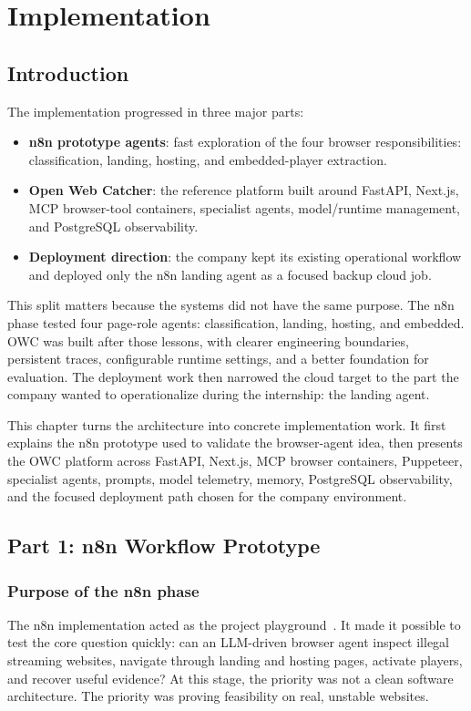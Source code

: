 \chapter{Implementation}\label{chap:implementation}

\section{Introduction}

The implementation progressed in three major parts:
\begin{itemize}
  \item \textbf{n8n prototype agents}: fast exploration of the four browser
  responsibilities: classification, landing, hosting, and embedded-player extraction.
  \item \textbf{Open Web Catcher}: the reference platform built around
  FastAPI, Next.js, MCP browser-tool containers, specialist agents, model/runtime
  management, and PostgreSQL observability.
  \item \textbf{Deployment direction}: the company kept its existing operational
  workflow and deployed only the n8n landing agent as a focused backup cloud job.
\end{itemize}

This split matters because the systems did not have the same purpose. The n8n phase
tested four page-role agents: classification, landing, hosting, and embedded. OWC was
built after those lessons, with clearer engineering boundaries, persistent traces,
configurable runtime settings, and a better foundation for evaluation. The deployment
work then narrowed the cloud target to the part the company wanted to operationalize
during the internship: the landing agent.

This chapter turns the architecture into concrete implementation work. It first
explains the n8n prototype used to validate the browser-agent idea, then
presents the OWC platform across FastAPI, Next.js, MCP browser containers, Puppeteer,
specialist agents, prompts, model telemetry, memory, PostgreSQL observability, and the
focused deployment path chosen for the company environment.
\section{Part 1: n8n Workflow Prototype}

\subsection{Purpose of the n8n phase}
The n8n implementation acted as the project playground~\cite{n8n}. It made it possible to
test the core question quickly: can an LLM-driven browser agent inspect illegal
streaming websites, navigate through landing and hosting pages, activate
players, and recover useful evidence? At this stage, the priority was not a
clean software architecture. The priority was proving feasibility on real,
unstable websites.

